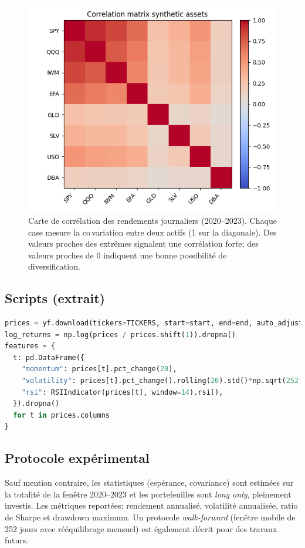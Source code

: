 \documentclass[11pt,a4paper]{article}
\begin{document}
\begin{figure}[h]
  \centering
  \includegraphics[width=0.7\linewidth]{../../figures/correlation_heatmap_generated.png}
  \caption{Carte de corrélation des rendements journaliers (2020--2023). Chaque case mesure la co\,variation entre deux actifs (1 sur la diagonale). Des valeurs proches des extrêmes signalent une corrélation forte; des valeurs proches de 0 indiquent une bonne possibilité de diversification.}
  \label{fig:corr_external}
\end{figure}

\subsection{Scripts (extrait)}
\begin{lstlisting}[language=Python,caption={Téléchargement et prétraitement (extrait)}]
prices = yf.download(tickers=TICKERS, start=start, end=end, auto_adjust=True)["Close"].dropna()
log_returns = np.log(prices / prices.shift(1)).dropna()
features = {
  t: pd.DataFrame({
    "momentum": prices[t].pct_change(20),
    "volatility": prices[t].pct_change().rolling(20).std()*np.sqrt(252),
    "rsi": RSIIndicator(prices[t], window=14).rsi(),
  }).dropna()
  for t in prices.columns
}
\end{lstlisting}

\subsection{Protocole expérimental}
Sauf mention contraire, les statistiques (espérance, covariance) sont estimées sur la totalité de la fenêtre 2020--2023 et les portefeuilles sont \emph{long only}, pleinement investis. Les métriques reportées: rendement annualisé, volatilité annualisée, ratio de Sharpe et drawdown maximum. Un protocole \emph{walk-forward} (fenêtre mobile de 252 jours avec rééquilibrage mensuel) est également décrit pour des travaux futurs.
\end{document}
